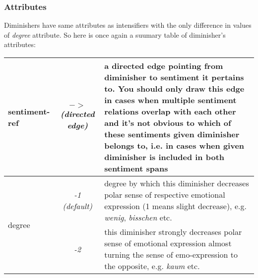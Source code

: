 \documentclass[11pt,a4paper]{article}
\begin{document}
\subsubsection{Attributes}
Diminishers have same attributes as intensifiers with the only
difference in values of \textit{degree} attribute. So here is once
again a suumary table of diminisher's attributes:

\begin{tabular}{|l|c|p{}|}\hline
  sentiment-ref & \textit{$->$\newline(directed edge)} & a directed
  edge pointing from diminisher to sentiment it pertains to. You
  should only draw this edge in cases when multiple sentiment
  relations overlap with each other and it's not obvious to which of
  these sentiments given diminisher belongs to, i.e. in cases when
  given diminisher is included in both sentiment spans\\\hline


  \multirow{2}{*}{degree} & \textit{-1 (default)} & degree by which
  this diminisher decreases polar sense of respective emotional
  expression (1 means slight decrease), e.g. \textit{wenig},
  \textit{bisschen} etc.\\\cline{2-3}

  & \textit{-2} & this diminisher strongly decreases polar sense of
  emotional expression almost turning the sense of emo-expression to
  the opposite, e.g. \textit{kaum} etc.\\\hline
\end{tabular}
\end{document}
